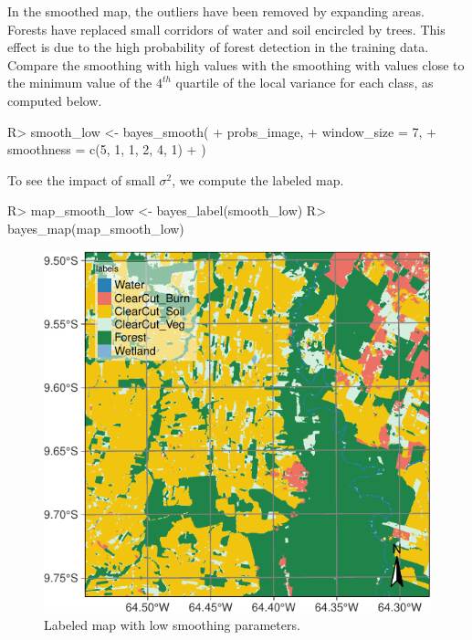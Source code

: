 \documentclass[
  shortnames]{jss}
\begin{document}
In the smoothed map, the outliers have been removed by expanding  areas. Forests have replaced small corridors of water and soil encircled by trees. This effect is due to the high probability of forest detection in the training data. Compare the smoothing with high values with the smoothing with values close to the minimum value of the \(4^{th}\) quartile of the local variance for each class, as computed below.

\begin{CodeChunk}
\begin{CodeInput}
R> smooth_low <- bayes_smooth(
+     probs_image,
+     window_size = 7,
+     smoothness = c(5, 1, 1, 2, 4, 1)
+ )
\end{CodeInput}
\end{CodeChunk}

To see the impact of small \(\sigma^2\), we compute the labeled map.

\begin{CodeChunk}
\begin{CodeInput}
R> map_smooth_low <- bayes_label(smooth_low)
R> bayes_map(map_smooth_low)
\end{CodeInput}
\begin{figure}[h]

{\centering \includegraphics{Bayesian_smoothing_JSS_files/figure-latex/smth2-1} 

}

\caption[Labeled map with low smoothing parameters]{Labeled map with low smoothing parameters.}\label{fig:smth2}
\end{figure}
\end{CodeChunk}
\end{document}
